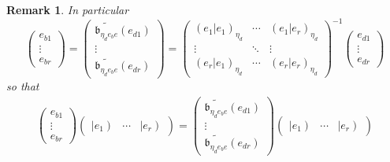 \documentclass[aps,preprint]{revtex4}
\newtheorem{remark}[theorem]{Remark}
\begin{document}
\begin{remark}
In particular%
\begin{equation}
\left( 
\begin{array}{c}
e_{b1} \\ 
\vdots \\ 
e_{br}%
\end{array}%
\right) =\left( 
\begin{array}{c}
\widetilde{\mathfrak{b}_{\eta _{d}e_{b}e}}\left( \overset{}{e_{d1}}\right)
\\ 
\vdots \\ 
\widetilde{\mathfrak{b}_{\eta _{d}e_{b}e}}\left( \overset{}{e_{dr}}\right)%
\end{array}%
\right) =\left( 
\begin{array}{ccc}
\left( \left. e_{1}\right\vert e_{1}\right) _{\eta _{d}} & \cdots & \left(
\left. e_{1}\right\vert e_{r}\right) _{\eta _{d}} \\ 
\vdots & \ddots & \vdots \\ 
\left( \left. e_{r}\right\vert e_{1}\right) _{\eta _{d}} & \cdots & \left(
\left. e_{r}\right\vert e_{r}\right) _{\eta _{d}}%
\end{array}%
\right) ^{-1}\left( 
\begin{array}{c}
e_{d1} \\ 
\vdots \\ 
e_{dr}%
\end{array}%
\right)
\end{equation}%
so that 
\begin{gather}
\left( 
\begin{array}{c}
e_{b1} \\ 
\vdots \\ 
e_{br}%
\end{array}%
\right) \left( 
\begin{array}{ccc}
\left\vert e_{1}\right) & \cdots & \left\vert e_{r}\right)%
\end{array}%
\right) =\left( 
\begin{array}{c}
\widetilde{\mathfrak{b}_{\eta _{d}e_{b}e}}\left( \overset{}{e_{d1}}\right)
\\ 
\vdots \\ 
\widetilde{\mathfrak{b}_{\eta _{d}e_{b}e}}\left( \overset{}{e_{dr}}\right)%
\end{array}%
\right) \left( 
\begin{array}{ccc}
\left\vert e_{1}\right) & \cdots & \left\vert e_{r}\right)%
\end{array}%
\right) \\

\end{gather}
\end{remark}
\end{document}
